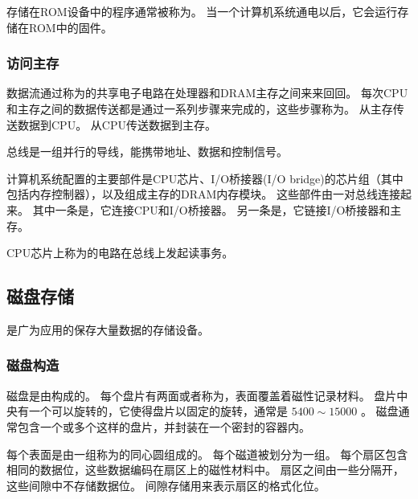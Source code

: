 {{{            存储在ROM设备中的程序通常被称为。
            当一个计算机系统通电以后，它会运行存储在ROM中的固件。
        }

        \subsubsection{访问主存}
        {
            数据流通过称为的共享电子电路在处理器和DRAM主存之间来来回回。
            每次CPU和主存之间的数据传送都是通过一系列步骤来完成的，这些步骤称为。
            从主存传送数据到CPU。
            从CPU传送数据到主存。

            总线是一组并行的导线，能携带地址、数据和控制信号。

            计算机系统配置的主要部件是CPU芯片、I/O桥接器(I/O bridge)的芯片组（其中包括内存控制器），以及组成主存的DRAM内存模块。
            这些部件由一对总线连接起来。
            其中一条是，它连接CPU和I/O桥接器。
            另一条是，它链接I/O桥接器和主存。

            CPU芯片上称为的电路在总线上发起读事务。
        }
    }

    \subsection{磁盘存储}
    {
        是广为应用的保存大量数据的存储设备。

        \subsubsection{磁盘构造}
        {
            磁盘是由构成的。
            每个盘片有两面或者称为，表面覆盖着磁性记录材料。
            盘片中央有一个可以旋转的，它使得盘片以固定的旋转，通常是 $5400 \sim 15000$ 。
            磁盘通常包含一个或多个这样的盘片，并封装在一个密封的容器内。

            每个表面是由一组称为的同心圆组成的。
            每个磁道被划分为一组。
            每个扇区包含相同的数据位，这些数据编码在扇区上的磁性材料中。
            扇区之间由一些分隔开，这些间隙中不存储数据位。
            间隙存储用来表示扇区的格式化位。

}}}
